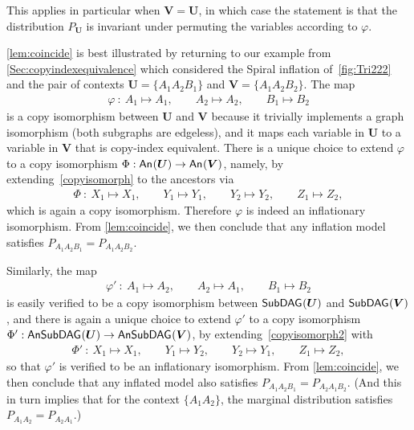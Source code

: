 \documentclass[aps,english,superscriptaddress,onecolumn,twoside,longbibliography,pra,floatfix,fleqn,nofootinbib]{revtex4-1}%
\theoremstyle{definition}
\newcommand{\An}[2][]{{\mathsf{An}_{#1}}\parenths{#2}}
\newcommand{\SmallNamedFunction}[3][]{\operatorname{\mathsf{#2}}_{#1}\parenths{#3}}
\newcommand{\subgraph}[2][]{\SmallNamedFunction[#1]{SubDAG}{#2}}
\newcommand{\ansubgraph}[2][]{\SmallNamedFunction[#1]{AnSubDAG}{#2}}
\DeclarePairedDelimiter{\parenths}{\lparen}{\rparen}
\begin{document}
This applies in particular when $\bm{V} = \bm{U}$, in which case the statement is that the distribution $P_{\bm{U}}$ is invariant under permuting the variables according to $\varphi$.

\cref{lem:coincide} is best illustrated by returning to our example from \cref{Sec:copyindexequivalence} 
which considered the Spiral inflation of~\cref{fig:Tri222} and the pair of contexts $\bm{U} = \{ A_1 A_2 B_1\}$ and $\bm{V} =\{ A_1 A_2 B_2\}$. The map 
\begin{align}\label{copyisomorph}
	\varphi \: : \: A_1 \mapsto A_1,\qquad A_2\mapsto A_2,\qquad B_1\mapsto B_2
\end{align}
is a copy isomorphism between $\bm{U}$ and $\bm{V}$
because it trivially implements a graph isomorphism (both subgraphs are edgeless), and it maps each variable in $\bm{U}$ to a variable in $\bm{V}$ that is copy-index equivalent. There is a unique choice to extend $\varphi$ to a copy isomorphism $\Phi:\An{\bm{U}}\to\An{\bm{V}}$, namely, by extending~\cref{copyisomorph} to the ancestors via
\begin{align}
\Phi \: : \: X_1\mapsto X_1,\qquad Y_1\mapsto Y_1, \qquad Y_2 \mapsto Y_2, \qquad Z_1 \mapsto Z_2,
\end{align}
which is again a copy isomorphism. 
Therefore $\varphi$ is indeed an inflationary isomorphism. From \cref{lem:coincide}, we then conclude that any inflation model satisfies $P_{A_1 A_2 B_1} = P_{A_1 A_2 B_2}$.

Similarly, the map 
\begin{align}\label{copyisomorph2}
	\varphi' \: : \: A_1 \mapsto A_2,\qquad A_2\mapsto A_1,\qquad B_1\mapsto B_2
\end{align}
is easily verified to be a copy isomorphism between $\subgraph{\bm{U}}$ and $\subgraph{\bm{V}}$, and there is again a unique choice to extend $\varphi'$ to a copy isomorphism $\Phi':\ansubgraph{\bm{U}}\to\ansubgraph{\bm{V}}$, by extending~\cref{copyisomorph2} with
\begin{align}
\Phi' \: : \: X_1\mapsto X_1,\qquad Y_1\mapsto Y_2, \qquad Y_2 \mapsto Y_1, \qquad Z_1 \mapsto Z_2,
\end{align}
so that $\varphi'$ is verified to be an inflationary isomorphism. From \cref{lem:coincide}, we then conclude that any inflated model also satisfies $P_{A_1 A_2 B_1} = P_{A_2 A_1 B_2}$.  (And this in turn implies that for the context $\{A_1 A_2\}$, the marginal distribution satisfies $P_{A_1 A_2} = P_{A_2 A_1}$.)
\end{document}
